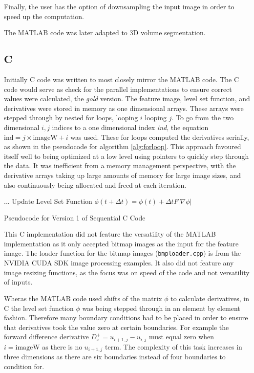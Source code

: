 Finally, the user has the option of downsampling the input image in order to speed up the computation.

The MATLAB code was later adapted to 3D volume segmentation.

	\subsection{C}
Initially C code was written to most closely mirror the MATLAB code. The C code would serve as check for the parallel implementations to ensure correct values were calculated, the \textit{gold} version. The feature image, level set function, and derivatives were stored in memory as one dimensional arrays. These arrays were stepped through by nested for loops, looping $i$ looping $j$. To go from the two dimensional $i,j$ indices to a one dimensional index \textit{ind}, the equation $\textrm{ind} = j \times \textrm{imageW} +i$ was used. These for loops computed the derivatives serially, as shown in the pseudocode for algorithm \ref{alg:forloop}. This approach favoured itself well to being optimized at a low level using pointers to quickly step through the data. It was inefficient from a memory management perspective, with the derivative arrays taking up large amounts of memory for large image sizes, and also continuously being allocated and freed at each iteration.

\begin{algorithm}[h]
\BlankLine
\dontprintsemicolon
{}
\BlankLine
...\;
\BlankLine
Update Level Set Function $\phi(t+\Delta t) =\phi(t) + \Delta t F|\nabla\phi|$\;
\caption{Pseudocode for Version 1 of Sequential C Code}\label{alg:forloop}
\end{algorithm}

This C implementation did not feature the versatility of the MATLAB implementation as it only accepted bitmap images as the input for the feature image. The loader function for the bitmap images (\texttt{bmploader.cpp}) is from the NVIDIA CUDA SDK image processing examples. It also did not feature any image resizing functions, as the focus was on speed of the code and not versatility of inputs.

Wheras the MATLAB code used shifts of the matrix $\phi$ to calculate derivatives, in C the level set function $\phi$ was being stepped through in an element by element fashion. Therefore many boundary conditions had to be placed in order to ensure that derivatives took the value zero at certain boundaries. For example the forward difference derivative $D_x^+ =u_{i+1,j}-u_{i,j}$ must equal zero when $i=\textrm{imageW}$ as there is no $u_{i+1,j}$ term. The complexity of this task increases in three dimensions as there are six boundaries instead of four boundaries to condition for.

